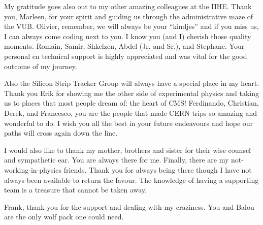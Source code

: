 \newpage \thispagestyle{empty}
My gratitude goes also out to my other amazing colleagues at the IIHE. Thank you, Marleen, for your spirit and guiding us through the administrative maze of the VUB. Olivier, remember, we will always be your ``kindjes'' and if you miss us, I can always come coding next to you. I know you (and I) cherish those quality moments. Romain, Samir, Shkelzen, Abdel (Jr. and Sr.), and Stephane. Your personal en technical support is highly appreciated and was vital for the good outcome of my journey. 


Also the Silicon Strip Tracker Group will always have a special place in my heart. Thank you Erik for showing me the other side of experimental physics and taking us to places that most people dream of: the heart of CMS! Ferdinando, Christian, Derek, and Francesco, you are the people that made CERN trips so amazing and wonderful to do. I wish you all the best in your future endeavours and hope our paths will cross again down the line. 


I would also like to thank my mother, brothers and sister for their wise counsel and sympathetic ear. You are always there for me. Finally, there are my not-working-in-physics friends. Thank you for always being there though I have not always been available to return the favour. The knowledge of having a supporting team is a treasure that cannot be taken away. 

Frank, thank you for the support and dealing with my craziness. You and Balou are the only wolf pack one could need.
